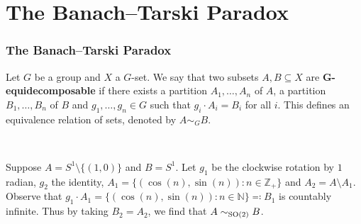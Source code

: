 \documentclass{beamer}
\newtheorem{proposition}{Proposition}
\theoremstyle{example}
\begin{document}

\section{The Banach--Tarski Paradox}

\begin{frame}
\frametitle{The Banach--Tarski Paradox}

\begin{definition}[Equidecomposability]
Let $G$ be a group and $X$ a $G$-set. We say that two subsets $A, B \subseteq X$ are \textbf{$\boldsymbol{G}$-equidecomposable} if there exists a partition $A_1, \dots, A_n$ of $A$, a partition $B_1, \dots, B_n$ of $B$ and $g_1, \dots, g_n \in G$ such that $g_i\cdot A_i = B_i$ for all $i$. This defines an equivalence relation of sets, denoted by $A \sim_G B$.
\end{definition}
\noindent\\[0.5\baselineskip]%
\begin{example}
Suppose $A = S^1\setminus\{(1, 0)\}$ and $B = S^1$. Let $g_1$ be the clockwise rotation by $1$ radian, $g_2$ the identity, $A_1 = \{(\cos(n), \sin(n)) : n \in \mathbb{Z}_+\}$ and $A_2 = A\setminus A_1$. Observe that $g_1\cdot A_1 = \{(\cos(n), \sin(n)) : n \in \mathbb{N}\} \eqcolon B_1$ is countably infinite. Thus by taking $B_2 = A_2$, we find that $A \sim_{\textup{SO}(2)} B$.
\end{example}
\end{frame}
\end{document}
